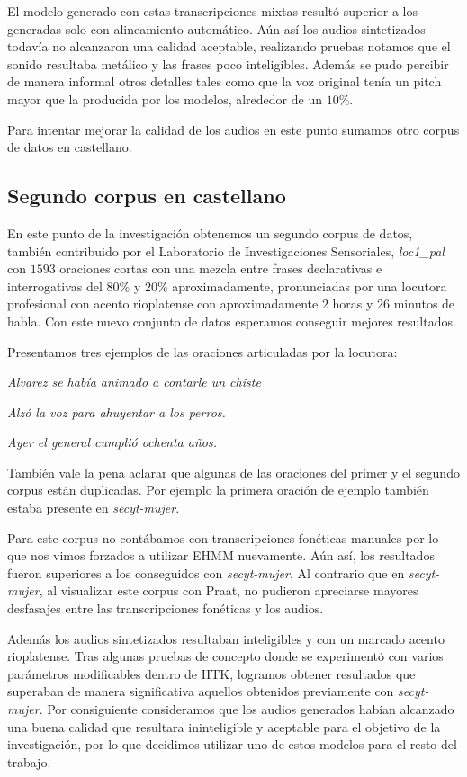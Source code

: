 El modelo generado con estas transcripciones mixtas resultó superior a los generadas solo con alineamiento automático. Aún así los audios sintetizados todavía no alcanzaron una calidad aceptable, realizando pruebas notamos que el sonido resultaba metálico y las frases poco inteligibles. Además se pudo percibir de manera informal otros detalles tales como que la voz original tenía un pitch mayor que la producida por los modelos, alrededor de un $10\%$.

Para intentar mejorar la calidad de los audios en este punto sumamos otro corpus de datos en castellano.

\subsection{Segundo corpus en castellano}

En este punto de la investigación obtenemos un segundo corpus de datos, también contribuido por el Laboratorio de Investigaciones Sensoriales, \textit{loc1\_pal} \cite{loc1pal} con $1593$ oraciones cortas con una mezcla entre frases declarativas e interrogativas del $80\%$ y $20\%$ aproximadamente, pronunciadas por una locutora profesional con acento rioplatense con aproximadamente $2$ horas y $26$ minutos de habla. Con este nuevo conjunto de datos esperamos conseguir mejores resultados.

Presentamos tres ejemplos de las oraciones articuladas por la locutora:

\indent\indent \textit{Alvarez se había animado a contarle un chiste}

\indent\indent \textit{Alzó la voz para ahuyentar a los perros.}

\indent\indent \textit{Ayer el general cumplió ochenta años.}

También vale la pena aclarar que algunas de las oraciones del primer y el segundo corpus están duplicadas. Por ejemplo la primera oración de ejemplo también estaba presente en \textit{secyt-mujer}.

Para este corpus no contábamos con transcripciones fonéticas manuales por lo que nos vimos forzados a utilizar EHMM nuevamente. Aún así, los resultados fueron superiores a los conseguidos con \textit{secyt-mujer}. Al contrario que en \textit{secyt-mujer}, al visualizar este corpus con Praat, no pudieron apreciarse mayores desfasajes entre las transcripciones fonéticas y los audios.

Además los audios sintetizados resultaban inteligibles y con un marcado acento rioplatense. Tras algunas pruebas de concepto donde se experimentó con varios parámetros modificables dentro de HTK, logramos obtener resultados que superaban de manera significativa aquellos obtenidos previamente con \textit{secyt-mujer}. Por consiguiente consideramos que los audios generados habían alcanzado una buena calidad que resultara ininteligible y aceptable para el objetivo de la investigación, por lo que decidimos utilizar uno de estos modelos para el resto del trabajo.

